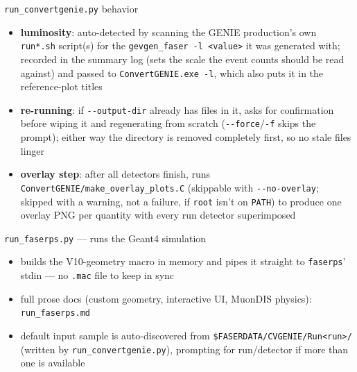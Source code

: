 \documentclass[aspectratio=169]{beamer}
\begin{document}
\begin{frame}{\texttt{run\_convertgenie.py} behavior}
  \footnotesize
  \begin{itemize}
    \item \textbf{luminosity}: auto-detected by scanning the GENIE
      production's own \texttt{run*.sh} script(s) for the
      \texttt{gevgen\_faser -l <value>} it was generated with; recorded in
      the summary log (sets the scale the event counts should be read
      against) and passed to \texttt{ConvertGENIE.exe -l}, which also puts
      it in the reference-plot titles
    \item \textbf{re-running}: if \texttt{-{}-output-dir} already has files
      in it, asks for confirmation before wiping it and regenerating from
      scratch (\texttt{-{}-force}/\texttt{-f} skips the prompt); either way
      the directory is removed completely first, so no stale files linger
    \item \textbf{overlay step}: after all detectors finish, runs
      \texttt{ConvertGENIE/make\_overlay\_plots.C} (skippable with
      \texttt{-{}-no-overlay}; skipped with a warning, not a failure, if
      \texttt{root} isn't on \texttt{PATH}) to produce one overlay PNG per
      quantity with every run detector superimposed
  \end{itemize}
\end{frame}

\begin{frame}{\texttt{run\_faserps.py} --- runs the Geant4 simulation}
  \begin{itemize}
    \item builds the V10-geometry macro in memory and pipes it straight to
      \texttt{faserps}' stdin --- no \texttt{.mac} file to keep in sync
    \item full prose docs (custom geometry, interactive UI, MuonDIS
      physics): \texttt{run\_faserps.md}
    \item default input sample is auto-discovered from
      \texttt{\$FASERDATA/CVGENIE/Run<run>/} (written by
      \texttt{run\_convertgenie.py}), prompting for run/detector if more
      than one is available
  \end{itemize}
\end{frame}
\end{document}
